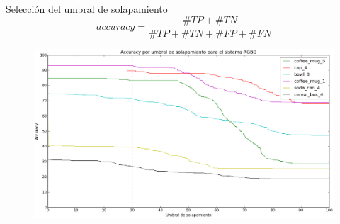 \documentclass[]{beamer}
\begin{document}
\begin{frame}[t]{Selección del umbral de solapamiento}
    \vspace*{-16pt}
    \small
    $$
    accuracy = \frac{\#TP + \#TN}{\#TP + \#TN + \#FP + \#FN}
    $$
    \normalsize
    \begin{figure}
        \centering
        \includegraphics[scale=0.22]{img/accuracy_sistemaRGBD.png}
    \end{figure}
\end{frame}
\end{document}
